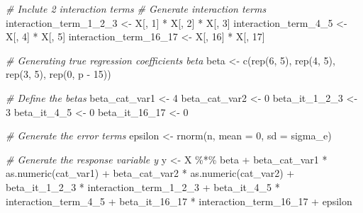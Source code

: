 \documentclass[
  11pt,
]{article}
\newenvironment{Shaded}{}{}
\newcommand{\AttributeTok}[1]{\textcolor[rgb]{0.49,0.56,0.16}{#1}}
\newcommand{\CommentTok}[1]{\textcolor[rgb]{0.38,0.63,0.69}{\textit{#1}}}
\newcommand{\DecValTok}[1]{\textcolor[rgb]{0.25,0.63,0.44}{#1}}
\newcommand{\FunctionTok}[1]{\textcolor[rgb]{0.02,0.16,0.49}{#1}}
\newcommand{\NormalTok}[1]{#1}
\newcommand{\OtherTok}[1]{\textcolor[rgb]{0.00,0.44,0.13}{#1}}
\newcommand{\SpecialCharTok}[1]{\textcolor[rgb]{0.25,0.44,0.63}{#1}}
\begin{document}
\begin{Shaded}
\begin{Highlighting}[]
  \CommentTok{\# Inclute 2 interaction terms}
  \CommentTok{\# Generate interaction terms}
\NormalTok{  interaction\_term\_1\_2\_3 }\OtherTok{\textless{}{-}}\NormalTok{ X[, }\DecValTok{1}\NormalTok{] }\SpecialCharTok{*}\NormalTok{ X[, }\DecValTok{2}\NormalTok{] }\SpecialCharTok{*}\NormalTok{ X[, }\DecValTok{3}\NormalTok{]}
\NormalTok{  interaction\_term\_4\_5 }\OtherTok{\textless{}{-}}\NormalTok{ X[, }\DecValTok{4}\NormalTok{] }\SpecialCharTok{*}\NormalTok{ X[, }\DecValTok{5}\NormalTok{]}
\NormalTok{  interaction\_term\_16\_17 }\OtherTok{\textless{}{-}}\NormalTok{ X[, }\DecValTok{16}\NormalTok{] }\SpecialCharTok{*}\NormalTok{ X[, }\DecValTok{17}\NormalTok{]}
  
  \CommentTok{\# Generating true regression coefficients beta}
\NormalTok{  beta }\OtherTok{\textless{}{-}} \FunctionTok{c}\NormalTok{(}\FunctionTok{rep}\NormalTok{(}\DecValTok{6}\NormalTok{, }\DecValTok{5}\NormalTok{), }\FunctionTok{rep}\NormalTok{(}\DecValTok{4}\NormalTok{, }\DecValTok{5}\NormalTok{), }\FunctionTok{rep}\NormalTok{(}\DecValTok{3}\NormalTok{, }\DecValTok{5}\NormalTok{), }\FunctionTok{rep}\NormalTok{(}\DecValTok{0}\NormalTok{, p }\SpecialCharTok{{-}} \DecValTok{15}\NormalTok{))}
  
  \CommentTok{\# Define the betas}
\NormalTok{  beta\_cat\_var1 }\OtherTok{\textless{}{-}} \DecValTok{4}
\NormalTok{  beta\_cat\_var2 }\OtherTok{\textless{}{-}} \DecValTok{0}
\NormalTok{  beta\_it\_1\_2\_3 }\OtherTok{\textless{}{-}} \DecValTok{3}
\NormalTok{  beta\_it\_4\_5 }\OtherTok{\textless{}{-}} \DecValTok{0}
\NormalTok{  beta\_it\_16\_17 }\OtherTok{\textless{}{-}} \DecValTok{0}
  
  \CommentTok{\# Generate the error terms}
\NormalTok{  epsilon }\OtherTok{\textless{}{-}} \FunctionTok{rnorm}\NormalTok{(n, }\AttributeTok{mean =} \DecValTok{0}\NormalTok{, }\AttributeTok{sd =}\NormalTok{ sigma\_e)}
  
  \CommentTok{\# Generate the response variable y}
\NormalTok{  y }\OtherTok{\textless{}{-}}\NormalTok{ X }\SpecialCharTok{\%*\%}\NormalTok{ beta }\SpecialCharTok{+} 
\NormalTok{    beta\_cat\_var1 }\SpecialCharTok{*} \FunctionTok{as.numeric}\NormalTok{(cat\_var1) }\SpecialCharTok{+} 
\NormalTok{    beta\_cat\_var2 }\SpecialCharTok{*} \FunctionTok{as.numeric}\NormalTok{(cat\_var2) }\SpecialCharTok{+} 
\NormalTok{    beta\_it\_1\_2\_3 }\SpecialCharTok{*}\NormalTok{ interaction\_term\_1\_2\_3 }\SpecialCharTok{+} 
\NormalTok{    beta\_it\_4\_5 }\SpecialCharTok{*}\NormalTok{ interaction\_term\_4\_5 }\SpecialCharTok{+} 
\NormalTok{    beta\_it\_16\_17 }\SpecialCharTok{*}\NormalTok{ interaction\_term\_16\_17 }\SpecialCharTok{+}
\NormalTok{    epsilon}
  

\end{Highlighting}
\end{Shaded}
\end{document}
